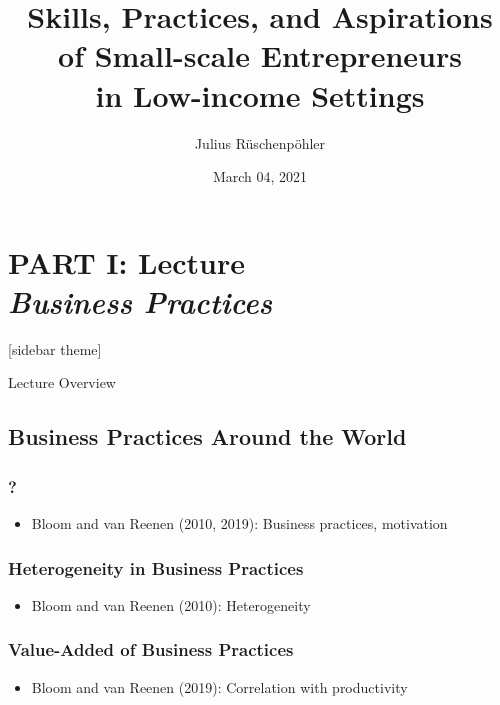 \documentclass[hideothersubsections, usenames,dvipsnames,10pt]{beamer}
\title[]{Skills, Practices, and Aspirations \\ of Small-scale Entrepreneurs \\ in Low-income Settings}
\author[]{Julius R{\"u}schenp{\"o}hler\inst{*}}
\institute[]{\inst{*} UC Berkeley, CEGA}
\date{March 04, 2021}
\begin{document}



\section{\textbf{PART I: Lecture} \\ \quad \emph{Business Practices}}



\begin{frame}
\titlepage
\end{frame}


[sidebar theme]

\begin{frame}{Lecture Overview}
\end{frame}

\subsection{Business Practices Around the World}

\begin{frame}
\frametitle{?}
	\begin{itemize}
	\item Bloom and van Reenen (2010, 2019): Business practices, motivation
	\vspace{0.2in}
	\end{itemize}
\end{frame}

\begin{frame}
\frametitle{Heterogeneity in Business Practices}
	\begin{itemize}
	\item Bloom and van Reenen (2010): Heterogeneity
	\vspace{0.2in}
	\end{itemize}
\end{frame}

\begin{frame}
\frametitle{Value-Added of Business Practices}
	\begin{itemize}
	\item Bloom and van Reenen (2019): Correlation with productivity
	\vspace{0.2in}
	\end{itemize}
\end{frame}
\end{document}

